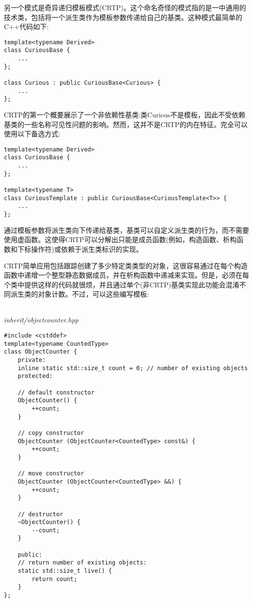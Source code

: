 
另一个模式是奇异递归模板模式(CRTP)。这个命名奇怪的模式指的是一中通用的技术类，包括将一个派生类作为模板参数传递给自己的基类。这种模式最简单的C++代码如下:

\begin{lstlisting}[style=styleCXX]
template<typename Derived>
class CuriousBase {
	...
};

class Curious : public CuriousBase<Curious> {
	...
};
\end{lstlisting}

CRTP的第一个概要展示了一个非依赖性基类:类Curious不是模板，因此不受依赖基类的一些名称可见性问题的影响。然而，这并不是CRTP的内在特征。完全可以使用以下备选方式:

\begin{lstlisting}[style=styleCXX]
template<typename Derived>
class CuriousBase {
	...
};

template<typename T>
class CuriousTemplate : public CuriousBase<CuriousTemplate<T>> {
	...
};
\end{lstlisting}

通过模板参数将派生类向下传递给基类，基类可以自定义派生类的行为，而不需要使用虚函数。这使得CRTP可以分解出只能是成员函数(例如，构造函数、析构函数和下标操作符)或依赖于派生类标识的实现。

CRTP简单应用包括跟踪创建了多少特定类类型的对象，这很容易通过在每个构造函数中递增一个整型静态数据成员，并在析构函数中递减来实现。但是，必须在每个类中提供这样的代码就很烦，并且通过单个(非CRTP)基类实现此功能会混淆不同派生类的对象计数。不过，可以这些编写模板:

\hspace*{\fill} \\ %
\noindent
\textit{inherit/objectcounter.hpp}
\begin{lstlisting}[style=styleCXX]
#include <cstddef>
template<typename CountedType>
class ObjectCounter {
	private:
	inline static std::size_t count = 0; // number of existing objects
	protected:
	
	// default constructor
	ObjectCounter() {
		++count;
	}

	// copy constructor
	ObjectCounter (ObjectCounter<CountedType> const&) {
		++count;
	}

	// move constructor
	ObjectCounter (ObjectCounter<CountedType> &&) {
		++count;
	}

	// destructor
	~ObjectCounter() {
		--count;
	}

	public:
	// return number of existing objects:
	static std::size_t live() {
		return count;
	}
};
\end{lstlisting}

